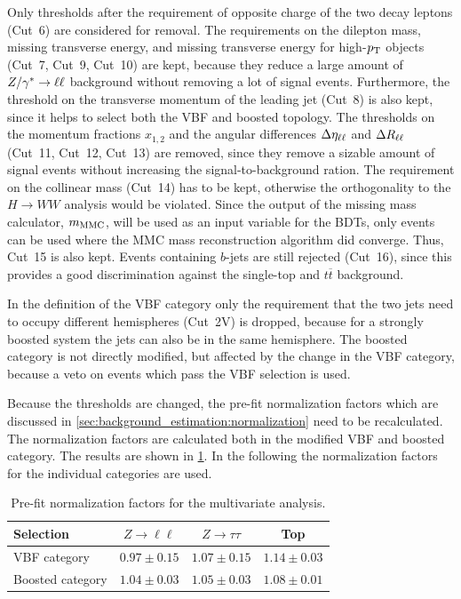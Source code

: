 Only thresholds after the requirement of opposite charge of the two decay leptons (Cut~6) are considered for removal.
The requirements on the dilepton mass, missing transverse energy, and missing transverse energy for high-$p_\text{T}$ objects
(Cut~7, Cut~9, Cut~10) are kept, because they reduce a large amount of $Z / \gamma^* \to \ell \ell$ background without removing a lot of signal
events.
Furthermore, the threshold on the transverse momentum of the leading jet (Cut~8) is also kept, since it helps to select
both the VBF and boosted topology.
The thresholds on the momentum fractions $x_{1,2}$ and the angular differences
$\Delta \eta_{\ell\ell}$ and $\Delta R_{\ell\ell}$ (Cut~11, Cut~12, Cut~13) are removed, since they remove a sizable amount of signal events without
increasing the signal-to-background ration.
The requirement on the collinear mass (Cut~14) has to be kept, otherwise the orthogonality to the $H \to WW$ analysis would be violated.
Since the output of the missing mass calculator, $m_\text{MMC}$, will be used as an input variable for the BDTs, only events can be used where
the MMC mass reconstruction algorithm did converge.
Thus, Cut~15 is also kept.
Events containing $b$-jets are still rejected (Cut~16), since this provides a good discrimination against the
single-top and $t\overline{t}$ background.

In the definition of the VBF category only the requirement that the two jets need to occupy different hemispheres (Cut~2V)
is dropped, because for a strongly boosted system the jets can also be in the same hemisphere.
The boosted category is not directly modified, but affected by the change in the VBF category, because a veto on events which pass the VBF selection is used.

Because the thresholds are changed, the pre-fit normalization factors which are discussed in \cref{sec:background_estimation:normalization}
need to be recalculated.
The normalization factors are calculated both in the modified VBF and boosted category.
The results are shown in \cref{tab:mva:event_selection:NF}.
In the following the normalization factors for the individual categories are used.

\begin{table}[htpb]
    \centering
    \caption{Pre-fit normalization factors for the multivariate analysis.}\label{tab:mva:event_selection:NF}
    \begin{tabular}{lccc}
        \toprule
        Selection        & $Z \to \ell\ell$ & $Z \to \tau\tau$ & Top \\ \midrule
        VBF category     & $0.97 \pm 0.15$ & $1.07 \pm 0.15$ & $1.14 \pm 0.03$ \\
        Boosted category & $1.04 \pm 0.03$ & $1.05 \pm 0.03$ & $1.08 \pm 0.01$ \\
        \bottomrule
    \end{tabular}
\end{table}

